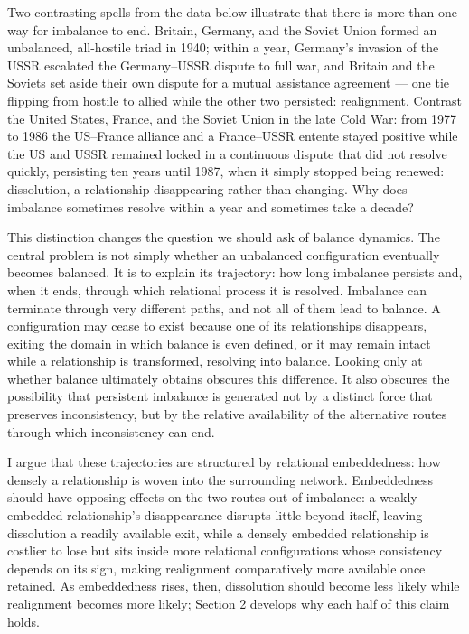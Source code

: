 \documentclass[Afour,sageh,times,doublespace]{sagej}
\begin{document}
Two contrasting spells from the data below illustrate that there is more than one way for imbalance to end. Britain, Germany, and the Soviet Union formed an unbalanced, all-hostile triad in 1940; within a year, Germany's invasion of the USSR escalated the Germany--USSR dispute to full war, and Britain and the Soviets set aside their own dispute for a mutual assistance agreement --- one tie flipping from hostile to allied while the other two persisted: realignment. Contrast the United States, France, and the Soviet Union in the late Cold War: from 1977 to 1986 the US--France alliance and a France--USSR entente stayed positive while the US and USSR remained locked in a continuous dispute that did not resolve quickly, persisting ten years until 1987, when it simply stopped being renewed: dissolution, a relationship disappearing rather than changing. Why does imbalance sometimes resolve within a year and sometimes take a decade?

This distinction changes the question we should ask of balance dynamics. The central problem is not simply whether an unbalanced configuration eventually becomes balanced. It is to explain its trajectory: how long imbalance persists and, when it ends, through which relational process it is resolved. Imbalance can terminate through very different paths, and not all of them lead to balance. A configuration may cease to exist because one of its relationships disappears, exiting the domain in which balance is even defined, or it may remain intact while a relationship is transformed, resolving into balance. Looking only at whether balance ultimately obtains obscures this difference. It also obscures the possibility that persistent imbalance is generated not by a distinct force that preserves inconsistency, but by the relative availability of the alternative routes through which inconsistency can end.

I argue that these trajectories are structured by relational embeddedness: how densely a relationship is woven into the surrounding network. Embeddedness should have opposing effects on the two routes out of imbalance: a weakly embedded relationship's disappearance disrupts little beyond itself, leaving dissolution a readily available exit, while a densely embedded relationship is costlier to lose but sits inside more relational configurations whose consistency depends on its sign, making realignment comparatively more available once retained. As embeddedness rises, then, dissolution should become less likely while realignment becomes more likely; Section 2 develops why each half of this claim holds.
\end{document}
